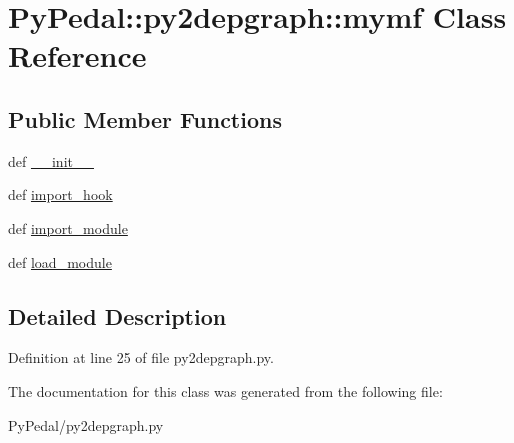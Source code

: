 \hypertarget{classPyPedal_1_1py2depgraph_1_1mymf}{
\section{PyPedal::py2depgraph::mymf Class Reference}
\label{classPyPedal_1_1py2depgraph_1_1mymf}
}
\subsection*{Public Member Functions}
\begin{CompactItemize}
\item 
\hypertarget{classPyPedal_1_1py2depgraph_1_1mymf_33f46dc710a6b65ece7900363c88d9d7}{
def \hyperlink{classPyPedal_1_1py2depgraph_1_1mymf_33f46dc710a6b65ece7900363c88d9d7}{\_\-\_\-init\_\-\_\-}}
\label{classPyPedal_1_1py2depgraph_1_1mymf_33f46dc710a6b65ece7900363c88d9d7}

\item 
\hypertarget{classPyPedal_1_1py2depgraph_1_1mymf_796d6921d3217a02b8f5a64305e017eb}{
def \hyperlink{classPyPedal_1_1py2depgraph_1_1mymf_796d6921d3217a02b8f5a64305e017eb}{import\_\-hook}}
\label{classPyPedal_1_1py2depgraph_1_1mymf_796d6921d3217a02b8f5a64305e017eb}

\item 
\hypertarget{classPyPedal_1_1py2depgraph_1_1mymf_bc63c996e09afeae90e0d73b29cea8d0}{
def \hyperlink{classPyPedal_1_1py2depgraph_1_1mymf_bc63c996e09afeae90e0d73b29cea8d0}{import\_\-module}}
\label{classPyPedal_1_1py2depgraph_1_1mymf_bc63c996e09afeae90e0d73b29cea8d0}

\item 
\hypertarget{classPyPedal_1_1py2depgraph_1_1mymf_27e9d2cd77ebae06cd10f171f26703cc}{
def \hyperlink{classPyPedal_1_1py2depgraph_1_1mymf_27e9d2cd77ebae06cd10f171f26703cc}{load\_\-module}}
\label{classPyPedal_1_1py2depgraph_1_1mymf_27e9d2cd77ebae06cd10f171f26703cc}

\end{CompactItemize}


\subsection{Detailed Description}


Definition at line 25 of file py2depgraph.py.

The documentation for this class was generated from the following file:\begin{CompactItemize}
\item 
PyPedal/py2depgraph.py\end{CompactItemize}
